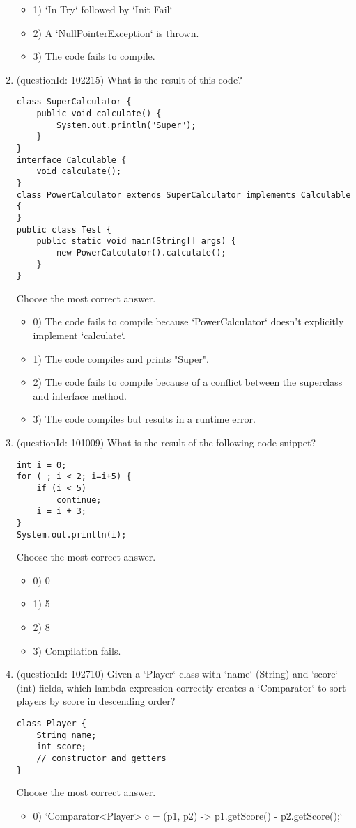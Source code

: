 \documentclass[12pt]{article}
\begin{document}
\begin{enumerate}[label=(\arabic*)]
\begin{itemize}
\item 1) `In Try` followed by `Init Fail`

\item 2) A `NullPointerException` is thrown.

\item 3) The code fails to compile.

\end{itemize}
\item (questionId: 102215) What is the result of this code?\n\begin{verbatim}
class SuperCalculator {
    public void calculate() {
        System.out.println("Super");
    }
}
interface Calculable {
    void calculate();
}
class PowerCalculator extends SuperCalculator implements Calculable {
}
public class Test {
    public static void main(String[] args) {
        new PowerCalculator().calculate();
    }
}
\end{verbatim}
Choose the most correct answer. 
\begin{itemize}
\item 0) The code fails to compile because `PowerCalculator` doesn't explicitly implement `calculate`.

\item 1) The code compiles and prints "Super".

\item 2) The code fails to compile because of a conflict between the superclass and interface method.

\item 3) The code compiles but results in a runtime error.

\end{itemize}
\item (questionId: 101009) What is the result of the following code snippet?\n\begin{verbatim}
int i = 0;
for ( ; i < 2; i=i+5) {
    if (i < 5)
        continue;
    i = i + 3;
}
System.out.println(i);
\end{verbatim}
Choose the most correct answer. 
\begin{itemize}
\item 0) 0

\item 1) 5

\item 2) 8

\item 3) Compilation fails.

\end{itemize}
\item (questionId: 102710) Given a `Player` class with `name` (String) and `score` (int) fields, which lambda expression correctly creates a `Comparator` to sort players by score in descending order?
\begin{verbatim}
class Player {
    String name;
    int score;
    // constructor and getters
}
\end{verbatim}
Choose the most correct answer. 
\begin{itemize}
\item 0) `Comparator<Player> c = (p1, p2) -> p1.getScore() - p2.getScore();`


\end{itemize}
\end{enumerate}
\end{document}
